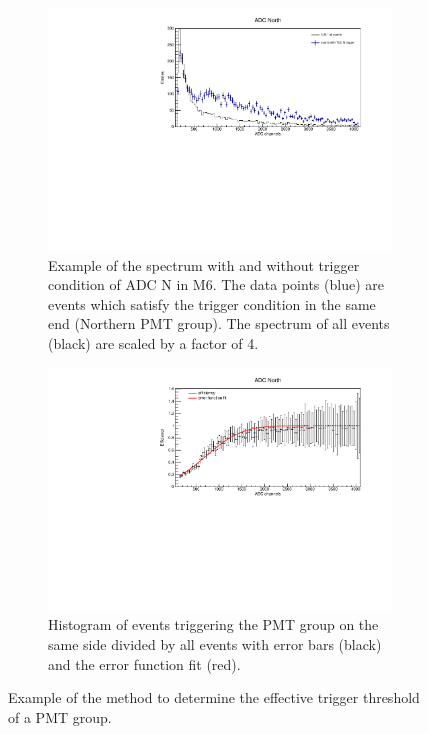 \begin{figure}[ht]
  \centering
  \begin{subfigure}{0.7\linewidth}
    \includegraphics[width=\linewidth{}]{./fig/M6AdcNorth2Histo.pdf}
    \caption{Example of the spectrum with and without trigger condition of ADC N in M6. The data points (blue) are events which satisfy the trigger condition in the same end (Northern PMT group). The spectrum of all events (black) are scaled by a factor of 4.}
    \label{fig:2HistoM6}
  \end{subfigure}
  \begin{subfigure}{0.7\linewidth}
    \includegraphics[width=\linewidth{}]{./fig/M6AdcNortheff_late.pdf}
    \caption{Histogram of events triggering the PMT group on the same side divided by all events with error bars (black) and the error function fit (red).}
    \label{fig:eff_lateM6}
  \end{subfigure}
  \caption{Example of the method to determine the effective trigger threshold of a PMT group.}
  \label{fig:threshold_example}
\end{figure}

